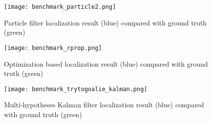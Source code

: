 \begin{figure}[h!]
\begin{center}
	\texttt{[image: benchmark\_particle2.png]}
\end{center}
\caption[Particle filter localization result compared with ground truth]{Particle filter localization result (blue) compared with ground truth (green)}
\label{fig:benchmarkParticle}
\end{figure}


\begin{figure}[h!]
\begin{center}
	\texttt{[image: benchmark\_rprop.png]}
\end{center}
\caption[Optimization based localization result compared with ground truth]{Optimization based localization result (blue) compared with ground truth (green)}
\label{fig:benchmarkRprop}
\end{figure}

\begin{figure}[h!]
\begin{center}
	\texttt{[image: benchmark\_trytogoalie\_kalman.png]}
\end{center}
\caption[Multi-hypotheses Kalman filter localization result compared with ground truth]{Multi-hypotheses Kalman filter localization result (blue) compared with ground truth (green)}
\label{fig:benchmarkKalman}
\end{figure}

